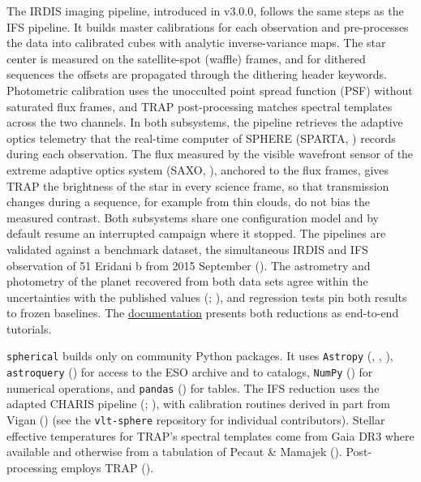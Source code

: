 \documentclass[
]{article}
\begin{document}
The IRDIS imaging pipeline, introduced in v3.0.0, follows the same steps
as the IFS pipeline. It builds master calibrations for each observation
and pre-processes the data into calibrated cubes with analytic
inverse-variance maps. The star center is measured on the satellite-spot
(waffle) frames, and for dithered sequences the offsets are propagated
through the dithering header keywords. Photometric calibration uses the
unocculted point spread function (PSF) without saturated flux frames,
and TRAP post-processing matches spectral templates across the two
channels. In both subsystems, the pipeline retrieves the adaptive optics
telemetry that the real-time computer of SPHERE (SPARTA,
) records during each
observation. The flux measured by the visible wavefront sensor of the
extreme adaptive optics system (SAXO,
), anchored to the flux
frames, gives TRAP the brightness of the star in every science frame, so
that transmission changes during a sequence, for example from thin
clouds, do not bias the measured contrast. Both subsystems share one
configuration model and by default resume an interrupted campaign where
it stopped. The pipelines are validated against a benchmark dataset, the
simultaneous IRDIS and IFS observation of 51 Eridani b from 2015
September (). The
astrometry and photometry of the planet recovered from both data sets
agree within the uncertainties with the published values
(;
), and regression tests
pin both results to frozen baselines. The
\href{https://spherical-hci.readthedocs.io}{documentation} presents both
reductions as end-to-end tutorials.

\texttt{spherical} builds only on community Python packages. It uses
\texttt{Astropy} (, ,
), \texttt{astroquery}
() for access to the
ESO archive and to catalogs, \texttt{NumPy}
() for numerical
operations, and \texttt{pandas} () for tables. The IFS reduction uses the adapted
CHARIS pipeline (;
), with calibration
routines derived in part from Vigan ()
(see the \texttt{vlt-sphere} repository for individual contributors).
Stellar effective temperatures for TRAP's spectral templates come from
Gaia DR3 where available and otherwise from a tabulation of Pecaut \&
Mamajek (). Post-processing employs TRAP
().
\end{document}
